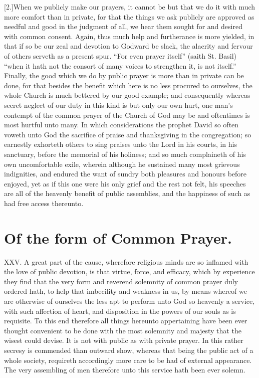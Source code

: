 [2.]When we publicly make our prayers, it cannot be but that we do it with much more comfort than in private, for that the things we ask publicly are approved as needful and good in the judgment of all, we hear them sought for and desired with common consent. Again, thus much help and furtherance is more yielded, in that if so be our zeal and devotion to Godward be slack, the alacrity and fervour of others serveth as a present spur. “For even prayer itself” (saith St. Basil) “when it hath not the consort of many voices to strengthen it, is not itself.” Finally, the good which we do  by public prayer is more than in private can be done, for that besides the benefit which here is no less procured to ourselves, the whole Church is much bettered by our good example;
 and consequently whereas secret neglect of our duty in this kind is but only our own hurt, one man’s contempt of the common prayer of the Church of God may be and oftentimes is most hurtful unto many. In which considerations the prophet David so often voweth unto God the sacrifice of praise and thanksgiving in the congregation; so earnestly exhorteth others to sing praises unto the Lord in his courts, in his sanctuary, before the memorial of his holiness; and so much complaineth of his own uncomfortable exile, wherein although he sustained many most grievous indignities, and endured the want of sundry both pleasures and honours before enjoyed, yet as if this one were his only grief and the rest not felt, his speeches are all of the heavenly benefit of public assemblies, and the happiness of such as had free access thereunto.


\section*{Of the form of Common Prayer.}
XXV. A great part of the cause, wherefore religious minds are so inflamed with the love of public devotion, is that virtue, force, and efficacy, which by experience they find that the very form and reverend solemnity of common prayer duly ordered hath, to help that imbecility and weakness in us, by means whereof we are otherwise of ourselves the less apt to perform unto God so heavenly a service, with such affection of heart, and disposition in the powers of our souls as is requisite. To this end therefore all things hereunto appertaining have been ever thought convenient to be done with the most solemnity and majesty that the wisest could devise. It is not with public as with private prayer. In this rather secresy is commended than outward show, whereas that being the public act of a whole society, requireth accordingly more care to be had of external appearance. The very assembling of men therefore unto this service hath been ever solemn.

